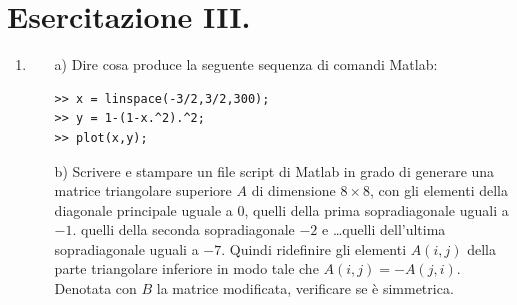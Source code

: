 \section{Esercitazione III.}

\begin{enumerate}
\item\begin{itemize}
\item[a)]Dire cosa produce la seguente sequenza di comandi Matlab:
\begin{codice}
\begin{verbatim}
>> x = linspace(-3/2,3/2,300);
>> y = 1-(1-x.^2).^2;
>> plot(x,y);
\end{verbatim}
\end{codice}
\item[b)]Scrivere e stampare un file script di Matlab in grado di generare una 
matrice triangolare superiore $A$ di dimensione $8 \times 8$, con gli elementi
della diagonale principale uguale a $0$, quelli della prima sopradiagonale
uguali a $-1$. quelli della seconda sopradiagonale $-2$ e \ldots quelli
dell'ultima sopradiagonale uguali a $-7$. Quindi ridefinire gli elementi
$A(i,j)$ della parte triangolare inferiore in modo tale che $A(i,j) = -A(j,i)$.
Denotata con $B$ la matrice modificata, verificare se è simmetrica.
\end{itemize}
\begin{svol}
\end{svol}
\end{enumerate}
